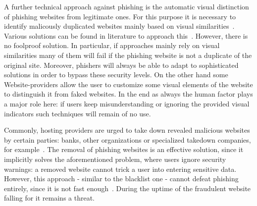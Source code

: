\begin{description}[leftmargin=0cm]
	\item[Visual distinction] A further technical approach against phishing is the automatic visual distinction of phishing websites from legitimate ones. For this purpose it is necessary to identify malicously duplicated websites mainly based on visual similarities~\cite{liu2006antiphishing}. Various solutions can be found in literature to approach this~\cite{chen2009fighting,chen2010detecting,zhang2011textual}. However, there is no foolproof solution. In particular, if approaches mainly rely on visual similarities many of them will fail if the phishing website is not a duplicate of the original site. Moreover, phishers will always be able to adapt to sophisticated solutions in order to bypass these security levels.
On the other hand some Website-providers allow the user to customize some visual elements of the website to distinguish it from faked websites. 
In the end as always the human factor plays a major role here: if users keep misunderstanding or ignoring the provided visual indicators such techniques will remain of no use.
	\item[Takedown] Commonly, hosting providers are urged to take down revealed malicious websites by certain parties: banks, other organizations or specialized takedown companies, for example~\cite{moore2007examining}. The removal of phishing websites is an effective solution, since it implicitly solves the aforementioned problem, where users ignore security warnings: a removed website cannot trick a user into entering sensitive data. However, this approach - similar to the blacklist one - cannot defeat phishing entirely, since it is not fast enough~\cite{moore2007examining}. During the uptime of the fraudulent website falling for it remains a threat.
\end{description}

